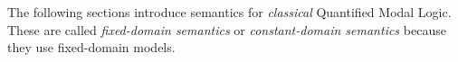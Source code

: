 \documentclass[../../../include/open-logic-section]{subfiles}
\begin{document}


The following sections introduce semantics for \emph{classical}
Quantified Modal Logic. These are called \emph{fixed-domain semantics}
or \emph{constant-domain semantics} because they 
use fixed-domain models.
\end{document}
